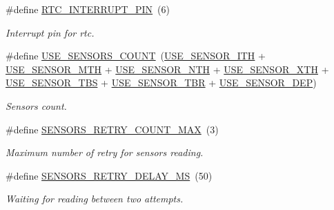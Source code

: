 \begin{DoxyCompactItemize}
\#define \hyperlink{rmap-config_8h_a1efb928882c9a9d83d78e499091a8319}{R\+T\+C\+\_\+\+I\+N\+T\+E\+R\+R\+U\+P\+T\+\_\+\+P\+IN}~(6)
\begin{DoxyCompactList}\small\item\em Interrupt pin for rtc. \end{DoxyCompactList}\item 
\mbox{\label{rmap-config_8h_af18dc3de744722cb308451b7a705611b}} 
\#define \hyperlink{rmap-config_8h_af18dc3de744722cb308451b7a705611b}{U\+S\+E\+\_\+\+S\+E\+N\+S\+O\+R\+S\+\_\+\+C\+O\+U\+NT}~(\hyperlink{sensors__config_8h_a22d6a7857098158d20b37de9080accb5}{U\+S\+E\+\_\+\+S\+E\+N\+S\+O\+R\+\_\+\+I\+TH} + \hyperlink{sensors__config_8h_a716f318739d3cc63bbe11a711152a93f}{U\+S\+E\+\_\+\+S\+E\+N\+S\+O\+R\+\_\+\+M\+TH} + \hyperlink{sensors__config_8h_a10ed05c0989cac98ec0dcccafe5eab2d}{U\+S\+E\+\_\+\+S\+E\+N\+S\+O\+R\+\_\+\+N\+TH} + \hyperlink{sensors__config_8h_a31485d4f9fa38af9114e6bd1455e989c}{U\+S\+E\+\_\+\+S\+E\+N\+S\+O\+R\+\_\+\+X\+TH} + \hyperlink{sensors__config_8h_a7d0abdd8465288cd55c86d95ad466cc7}{U\+S\+E\+\_\+\+S\+E\+N\+S\+O\+R\+\_\+\+T\+BS} + \hyperlink{sensors__config_8h_aba1fe603fab2f047ac3913e33b6f8cce}{U\+S\+E\+\_\+\+S\+E\+N\+S\+O\+R\+\_\+\+T\+BR} + \hyperlink{sensors__config_8h_a41a207ce017a43c492f8d2a0bf11a598}{U\+S\+E\+\_\+\+S\+E\+N\+S\+O\+R\+\_\+\+D\+EP})
\begin{DoxyCompactList}\small\item\em Sensors count. \end{DoxyCompactList}\item 
\mbox{\label{rmap-config_8h_a16fa5577ef44bb1146f17a3bc43194b1}} 
\#define \hyperlink{rmap-config_8h_a16fa5577ef44bb1146f17a3bc43194b1}{S\+E\+N\+S\+O\+R\+S\+\_\+\+R\+E\+T\+R\+Y\+\_\+\+C\+O\+U\+N\+T\+\_\+\+M\+AX}~(3)
\begin{DoxyCompactList}\small\item\em Maximum number of retry for sensors reading. \end{DoxyCompactList}\item 
\mbox{\label{rmap-config_8h_a8ea8eeea7855628652f697bab3d173b5}} 
\#define \hyperlink{rmap-config_8h_a8ea8eeea7855628652f697bab3d173b5}{S\+E\+N\+S\+O\+R\+S\+\_\+\+R\+E\+T\+R\+Y\+\_\+\+D\+E\+L\+A\+Y\+\_\+\+MS}~(50)
\begin{DoxyCompactList}\small\item\em Waiting for reading between two attempts. \end{DoxyCompactList}\item 

\end{DoxyCompactItemize}
